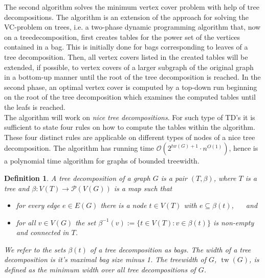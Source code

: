 \documentclass[11pt,a4paper]{article}
\newtheorem*{definition}{Definition}
\DeclareMathOperator{\tw}{tw}
\begin{document}
The second algorithm solves the minimum vertex cover problem with help of tree decompositions. The algorithm is an extension of the approach for solving the VC-problem on trees, i.e. a two-phase dynamic programming algorithm that, now on a treedecomposition, first creates tables for the power set of the vertices contained in a bag. This is initially done for bags corresponding to leaves of a tree decomposition. Then, all vertex covers listed in the created tables will be extended, if possible, to vertex covers of a larger subgraph of the original graph in a bottom-up manner until the root of the tree decomposition is reached. In the second phase, an optimal vertex cover is computed by a top-down run beginning on the root of the tree decomposition which examines the computed tables until the leafs is reached. \\
The algorithm will work on \emph{nice tree decompositions}. For such type of TD's it is sufficient to state four rules on how to compute the tables within the algorithm. These four distinct rules are applicable on different types of nodes of a nice tree decomposition. The algorithm has running time $\mathcal{O}(2^{tw(G)+1} \cdot n^{O(1)})$, hence is a polynomial time algorithm for graphs of bounded treewidth. \\ 

\begin{definition}
A \emph{tree decomposition} of a graph $G$ is a pair $(T, \beta)$, where $T$ is a tree and $\beta: V(T) \rightarrow \mathcal{P}(V(G))$ is a map such that
\begin{itemize}
\setlength{\itemindent}{.2in}
\item [(T1)] for every edge $e \in E(G)$ there is a node $t \in V(T)$ with $e \subseteq \beta(t)$, $\quad$ and 
\item [(T2)] for all $v \in V(G)$ the set $\beta^{-1}(v) := \{t \in V(T) : v \in \beta(t)\}$ is non-empty and connected in $T$.
\end{itemize}

\vspace*{2mm}

We refer to the sets $\beta(t)$ of a tree decomposition as \emph{bags}. The width of a tree decomposition is it's maximal bag size minus 1. The \emph{treewidth} of $G$, $\tw(G)$, is defined as the minimum width over all tree decompositions of $G$. \\
\end{definition}
\end{document}
